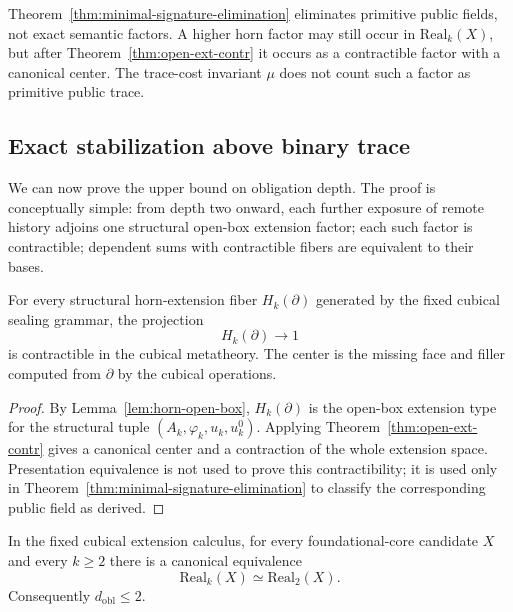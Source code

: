 \begin{remark}
Theorem~\ref{thm:minimal-signature-elimination} eliminates primitive public fields, not exact
semantic factors.  A higher horn factor may still occur in \(\mathrm{Real}_k(X)\), but after
Theorem~\ref{thm:open-ext-contr} it occurs as a contractible factor with a canonical center.
The trace-cost invariant \(\mu\) does not count such a factor as primitive public trace.
\end{remark}

\subsection{Exact stabilization above binary trace}
\label{subsec:exact-stabilization}

We can now prove the upper bound on obligation depth.  The proof is conceptually simple:
from depth two onward, each further exposure of remote history adjoins one structural
open-box extension factor; each such factor is contractible; dependent sums with
contractible fibers are equivalent to their bases.

\begin{lemma}
\label{lem:kan-contraction-horn-fibers}
For every structural horn-extension fiber \(H_k(\partial)\) generated by the fixed cubical
sealing grammar, the projection
\[
  H_k(\partial) \to 1
\]
is contractible in the cubical metatheory.  The center is the missing face and filler computed
from \(\partial\) by the cubical operations.
\end{lemma}

\begin{proof}
By Lemma~\ref{lem:horn-open-box}, \(H_k(\partial)\) is the open-box extension type for the
structural tuple \((A_k,\varphi_k,u_k,u^0_k)\).  Applying
Theorem~\ref{thm:open-ext-contr} gives a canonical center and a contraction of the whole
extension space.  Presentation equivalence is not used to prove this contractibility; it is
used only in Theorem~\ref{thm:minimal-signature-elimination} to classify the corresponding
public field as derived.
\end{proof}

\begin{theorem}
\label{thm:exact-stabilization}
In the fixed cubical extension calculus, for every foundational-core candidate \(X\) and
every \(k\geq 2\) there is a canonical equivalence
\[
  \mathrm{Real}_k(X) \simeq \mathrm{Real}_2(X).
\]
Consequently \(d_{\mathrm{obl}}\leq 2\).
\end{theorem}

